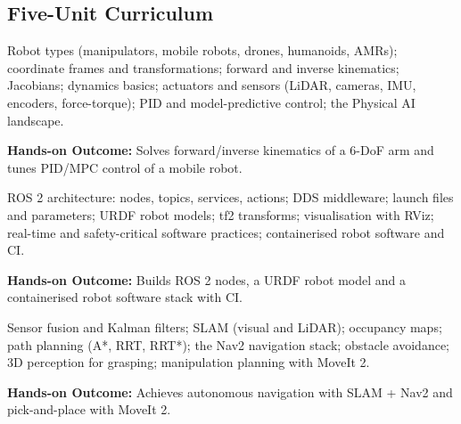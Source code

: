 \documentclass[10pt,a4paper]{article}
\begin{document}
\subsection*{Five-Unit Curriculum}
\begin{tcolorbox}[unitbox,title={{\color{gold}UNIT I}\quad Robotics Foundations\hfill{\color{gold}9 Hours}}]\small Robot types (manipulators, mobile robots, drones, humanoids, AMRs); coordinate frames and transformations; forward and inverse kinematics; Jacobians; dynamics basics; actuators and sensors (LiDAR, cameras, IMU, encoders, force-torque); PID and model-predictive control; the Physical AI landscape.\par\vspace{2pt}\par\textbf{Hands-on Outcome:} Solves forward/inverse kinematics of a 6-DoF arm and tunes PID/MPC control of a mobile robot.\end{tcolorbox}
\begin{tcolorbox}[unitbox,title={{\color{gold}UNIT II}\quad ROS 2 and Robot Software Engineering\hfill{\color{gold}9 Hours}}]\small ROS 2 architecture: nodes, topics, services, actions; DDS middleware; launch files and parameters; URDF robot models; tf2 transforms; visualisation with RViz; real-time and safety-critical software practices; containerised robot software and CI.\par\vspace{2pt}\par\textbf{Hands-on Outcome:} Builds ROS 2 nodes, a URDF robot model and a containerised robot software stack with CI.\end{tcolorbox}
\begin{tcolorbox}[unitbox,title={{\color{gold}UNIT III}\quad Perception, Localisation and Navigation\hfill{\color{gold}9 Hours}}]\small Sensor fusion and Kalman filters; SLAM (visual and LiDAR); occupancy maps; path planning (A*, RRT, RRT*); the Nav2 navigation stack; obstacle avoidance; 3D perception for grasping; manipulation planning with MoveIt 2.\par\vspace{2pt}\par\textbf{Hands-on Outcome:} Achieves autonomous navigation with SLAM + Nav2 and pick-and-place with MoveIt 2.\end{tcolorbox}
\end{document}
